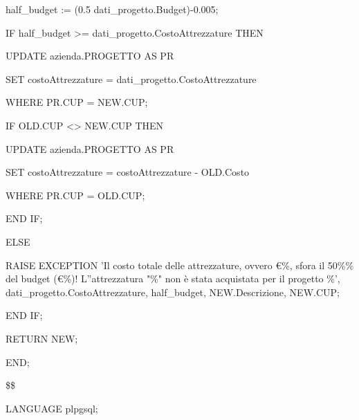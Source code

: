 \begin{flushleft}
\begin{description}
\begin{description}
                    \vspace{0.5cm}

                    \item half\_budget := (0.5 \* dati\_progetto.Budget)-0.005;
                
                    \vspace{0.5cm}

                    \item IF half\_budget >= dati\_progetto.CostoAttrezzature THEN
                    \begin{description}
                        \item UPDATE azienda.PROGETTO AS PR
                        \item SET costoAttrezzature = dati\_progetto.CostoAttrezzature
                        \item WHERE PR.CUP = NEW.CUP;

                        \vspace{0.5cm}

                        \item IF OLD.CUP <> NEW.CUP THEN
                        \begin{description}
                            \item UPDATE azienda.PROGETTO AS PR
                            \item SET costoAttrezzature = costoAttrezzature - OLD.Costo
                            \item WHERE PR.CUP = OLD.CUP;
                        \end{description}
                        \item END IF;
                    \end{description}
                    \item ELSE
                    \begin{description}
                        \item RAISE EXCEPTION 'Il costo totale delle attrezzature, ovvero €\%, sfora il 50\%\% del budget (€\%)! L''attrezzatura "\%" non è stata acquistata per il progetto \%', dati\_progetto.CostoAttrezzature, half\_budget, NEW.Descrizione, NEW.CUP;
                    \end{description}
                    \item END IF;
                
                    \item RETURN NEW;

                \end{description}

                \item END;
                \item \$\$
                \item LANGUAGE plpgsql;
            \end{description}
        \end{flushleft}
    \normalfont

